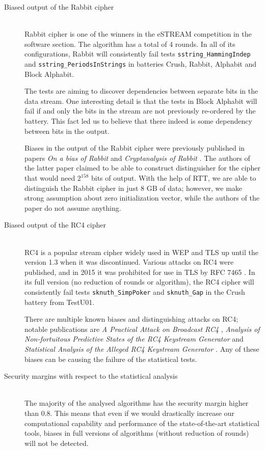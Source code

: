 \documentclass[
	digital,    %
	oneside,    %
	color,
	11pt,
	nocover,
	notable,
	nolof,
	nolot,
]{fithesis3}
\theoremstyle{definition}
\theoremstyle{remark}
\begin{document}
\begin{description}
\item[Biased output of the Rabbit cipher] \hfill \\
Rabbit \cite{rabbit} cipher is one of the winners in the eSTREAM competition in the software section. The algorithm has a total of 4 rounds. In all of its configurations, Rabbit will consistently fail tests \texttt{sstring\_HammingIndep} and \texttt{sstring\_PeriodsInStrings} in batteries Crush, Rabbit, Alphabit and Block Alphabit. 

The tests are aiming to discover dependencies between separate bits in the data stream. One interesting detail is that the tests in Block Alphabit will fail if and only the bits in the stream are not previously re-ordered by the battery. This fact led us to believe that there indeed is some dependency between bits in the output.

Biases in the output of the Rabbit cipher were previously published in papers \textit{On a bias of Rabbit} \cite{rabbit-bias-1} and \textit{Cryptanalysis of Rabbit} \cite{rabbit-bias-2}. The authors of the latter paper claimed to be able to construct distinguisher for the cipher that would need $2^{158}$ bits of output. With the help of RTT, we are able to distinguish the Rabbit cipher in just 8 GB of data; however, we make strong assumption about zero initialization vector, while the authors of the paper do not assume anything.

\item[Biased output of the RC4 cipher] \hfill \\
RC4 \cite{rc4} is a popular stream cipher widely used in WEP and TLS up until the version 1.3 when it was discontinued. Various attacks on RC4 were published, and in 2015 it was prohibited for use in TLS by RFC 7465 \cite{rfc7465}. In its full version (no reduction of rounds or algorithm), the RC4 cipher will consistently fail tests \texttt{sknuth\_SimpPoker} and \texttt{sknuth\_Gap} in the Crush battery from TestU01.

There are multiple known biases and distinguishing attacks on RC4; notable publications are \textit{A Practical Attack on Broadcast RC4} \cite{rc4-bias-1}, \textit{Analysis of Non-fortuitous Predictive States of the RC4 Keystream Generator} \cite{rc4-bias-2} and \textit{Statistical Analysis of the Alleged RC4 Keystream Generator} \cite{rc4-bias-3}. Any of these biases can be causing the failure of the statistical tests.

\item[Security margins with respect to the statistical analysis] \hfill \\
The majority of the analysed algorithms has the security margin higher than 0.8. This means that even if we would drastically increase our computational capability and performance of the state-of-the-art statistical tools, biases in full versions of algorithms (without reduction of rounds) will not be detected.


\end{description}
\end{document}
